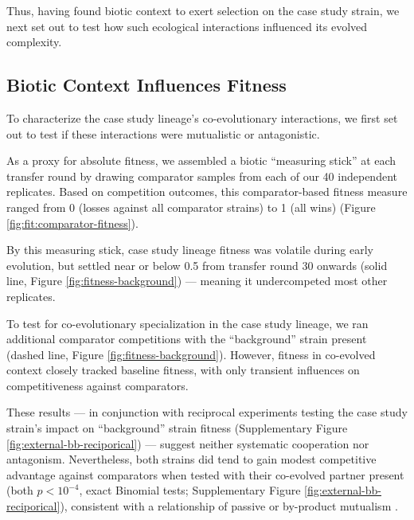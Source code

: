 Thus, having found biotic context to exert selection on the case study strain, we next set out to test how such ecological interactions influenced its evolved complexity.

\subsection{Biotic Context Influences Fitness}
\label{sec:biotic-context-influences-fitness}



To characterize the case study lineage's co-evolutionary interactions, we first set out to test if these interactions were mutualistic or antagonistic.

As a proxy for absolute fitness, we assembled a biotic ``measuring stick'' at each transfer round by drawing comparator samples from each of our 40 independent replicates.
Based on competition outcomes, this comparator-based fitness measure ranged from 0 (losses against all comparator strains) to 1 (all wins) (Figure \ref{fig:fit:comparator-fitness}).

By this measuring stick, case study lineage fitness was volatile during early evolution, but settled near or below 0.5 from transfer round 30 onwards (solid line, Figure \ref{fig:fitness-background}) --- meaning it undercompeted most other replicates.

To test for co-evolutionary specialization in the case study lineage, we ran additional comparator competitions with the ``background'' strain  present (dashed line, Figure \ref{fig:fitness-background}).
However, fitness in co-evolved context closely tracked baseline fitness, with only transient influences on competitiveness against comparators.

These results --- in conjunction with reciprocal experiments testing the case study strain's impact on ``background'' strain fitness (Supplementary Figure \ref{fig:external-bb-reciporical}) --- suggest neither systematic cooperation nor antagonism.
Nevertheless, both strains did tend to gain modest competitive advantage against comparators when tested with their co-evolved partner present (both $p < 10^{-4}$, exact Binomial tests; Supplementary Figure \ref{fig:external-bb-reciporical}), consistent with a relationship of passive or by-product mutualism \citep{marchal2017passive,connor1995benefits}.

